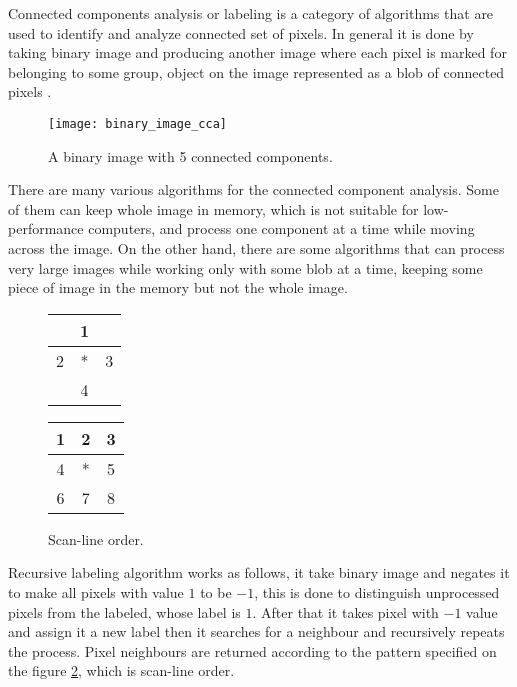 \documentclass[../../../../main]{subfiles}
\begin{document}
Connected components analysis or labeling is a category of algorithms that are used to identify and analyze connected set of pixels. In general it is done by taking binary image and producing another image where each pixel is marked for belonging to some group, object on the image represented as a blob of connected pixels \cite{binary_image_analysis_washington}. 

\begin{figure} [!ht]
  \centering    
    \texttt{[image: binary\_image\_cca]}
    \label{fig:binaryImageCca}
  \caption{A binary image with 5 connected components.}
\end{figure}

There are many various algorithms for the connected component analysis. Some of them can keep whole image in memory, which is not suitable for low-performance computers, and process one component at a time while moving across the image. On the other hand, there are some algorithms that can process very large images while working only with some blob at a time, keeping some piece of image in the memory but not the whole image.

\begin{figure} [!ht]
  \centering    
    \begin{tabular}{ |c|c|c| }
        \hline
        &1&\\
        \hline
        2& *& 3\\
        \hline
        & 4&\\
        \hline
    \end{tabular}
     \begin{tabular}{ |c|c|c| }
        \hline
        1& 2& 3\\
        \hline
        4& *& 5\\
        \hline
        6& 7& 8\\
        \hline
    \end{tabular}
    \label{fig:recursiveCcPatterns}
  \caption{Scan-line order.}
\end{figure}

Recursive labeling algorithm works as follows, it take binary image and negates it to make all pixels with value $1$ to be $-1$, this is done to distinguish unprocessed pixels from the labeled, whose label is $1$. After that it takes pixel with $-1$ value and assign it a new label then it searches for a neighbour and recursively repeats the process. Pixel neighbours are returned according to the pattern specified on the figure \ref{fig:recursiveCcPatterns}, which is scan-line order.
\end{document}
